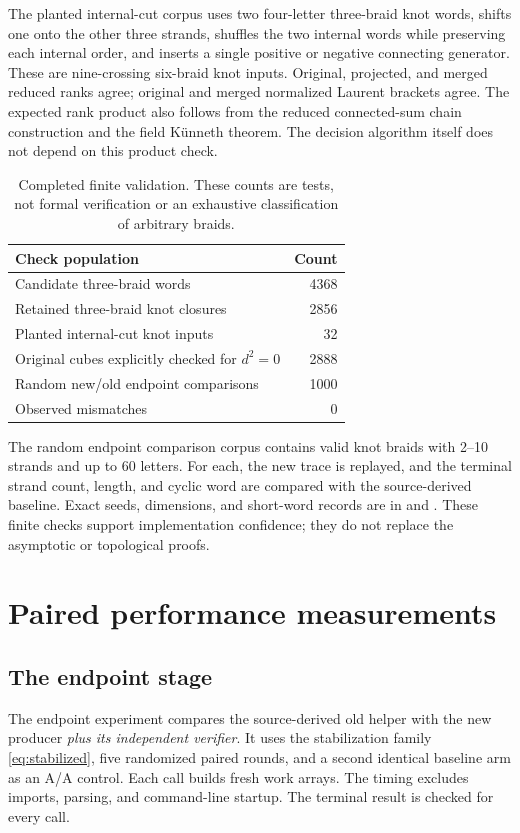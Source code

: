 \documentclass[11pt,letterpaper]{article}
\theoremstyle{definition}
\begin{document}
The planted internal-cut corpus uses two four-letter three-braid knot words, shifts one onto the other three strands, shuffles the two internal words while preserving each internal order, and inserts a single positive or negative connecting generator. These are nine-crossing six-braid knot inputs. Original, projected, and merged reduced ranks agree; original and merged normalized Laurent brackets agree. The expected rank product also follows from the reduced connected-sum chain construction and the field K\"unneth theorem. The decision algorithm itself does not depend on this product check.

\begin{table}[htbp]
\centering
\caption{Completed finite validation. These counts are tests, not formal verification or an exhaustive classification of arbitrary braids.}
\label{tab:validation}
\begin{tabular}{lr}
\toprule
Check population & Count \\
\midrule
Candidate three-braid words & 4368 \\
Retained three-braid knot closures & 2856 \\
Planted internal-cut knot inputs & 32 \\
Original cubes explicitly checked for $d^2=0$ & 2888 \\
Random new/old endpoint comparisons & 1000 \\
Observed mismatches & 0 \\
\bottomrule
\end{tabular}
\end{table}

The random endpoint comparison corpus contains valid knot braids with 2--10 strands and up to 60 letters. For each, the new trace is replayed, and the terminal strand count, length, and cyclic word are compared with the source-derived baseline. Exact seeds, dimensions, and short-word records are in  and . These finite checks support implementation confidence; they do not replace the asymptotic or topological proofs.

\section{Paired performance measurements}
\label{sec:measurements}

\subsection{The endpoint stage}
The endpoint experiment compares the source-derived old helper with the new producer \emph{plus its independent verifier}. It uses the stabilization family \eqref{eq:stabilized}, five randomized paired rounds, and a second identical baseline arm as an A/A control. Each call builds fresh work arrays. The timing excludes imports, parsing, and command-line startup. The terminal result is checked for every call.
\end{document}
